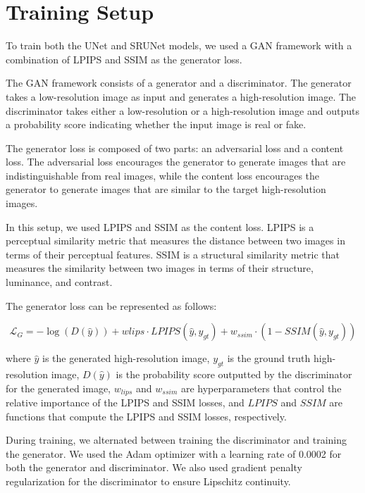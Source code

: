 \section{Training Setup}

To train both the UNet and SRUNet models, we used a GAN framework with a combination of LPIPS and SSIM as the generator loss.

The GAN framework consists of a generator and a discriminator. The generator takes a low-resolution image as input and generates a high-resolution image. The discriminator takes either a low-resolution or a high-resolution image and outputs a probability score indicating whether the input image is real or fake.

The generator loss is composed of two parts: an adversarial loss and a content loss. The adversarial loss encourages the generator to generate images that are indistinguishable from real images, while the content loss encourages the generator to generate images that are similar to the target high-resolution images.

In this setup, we used LPIPS and SSIM as the content loss. LPIPS is a perceptual similarity metric that measures the distance between two images in terms of their perceptual features. SSIM is a structural similarity metric that measures the similarity between two images in terms of their structure, luminance, and contrast.

The generator loss can be represented as follows:

$$\mathcal{L}_{G} = -\log(D(\hat{y})) + w{lips}\cdot LPIPS(\hat{y}, y_{gt}) + w_{ssim} \cdot (1 - SSIM(\hat{y}, y_{gt}))$$

where $\hat{y}$ is the generated high-resolution image, $y_{gt}$ is the ground truth high-resolution image, $D(\hat{y})$ is the probability score outputted by the discriminator for the generated image, $w_{lips}$ and $w_{ssim}$ are hyperparameters that control the relative importance of the LPIPS and SSIM losses, and $LPIPS$ and $SSIM$ are functions that compute the LPIPS and SSIM losses, respectively.

During training, we alternated between training the discriminator and training the generator. We used the Adam optimizer with a learning rate of 0.0002 for both the generator and discriminator. We also used gradient penalty regularization for the discriminator to ensure Lipschitz continuity.

